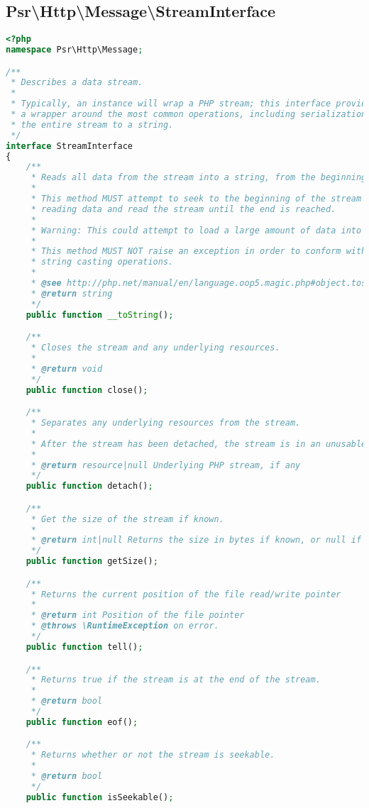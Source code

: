 \subsection{Psr\textbackslash Http\textbackslash Message\textbackslash StreamInterface}


\begin{lstlisting}[language=PHP]
<?php
namespace Psr\Http\Message;

/**
 * Describes a data stream.
 *
 * Typically, an instance will wrap a PHP stream; this interface provides
 * a wrapper around the most common operations, including serialization of
 * the entire stream to a string.
 */
interface StreamInterface
{
    /**
     * Reads all data from the stream into a string, from the beginning to end.
     *
     * This method MUST attempt to seek to the beginning of the stream before
     * reading data and read the stream until the end is reached.
     *
     * Warning: This could attempt to load a large amount of data into memory.
     *
     * This method MUST NOT raise an exception in order to conform with PHP's
     * string casting operations.
     *
     * @see http://php.net/manual/en/language.oop5.magic.php#object.tostring
     * @return string
     */
    public function __toString();

    /**
     * Closes the stream and any underlying resources.
     *
     * @return void
     */
    public function close();

    /**
     * Separates any underlying resources from the stream.
     *
     * After the stream has been detached, the stream is in an unusable state.
     *
     * @return resource|null Underlying PHP stream, if any
     */
    public function detach();

    /**
     * Get the size of the stream if known.
     *
     * @return int|null Returns the size in bytes if known, or null if unknown.
     */
    public function getSize();

    /**
     * Returns the current position of the file read/write pointer
     *
     * @return int Position of the file pointer
     * @throws \RuntimeException on error.
     */
    public function tell();

    /**
     * Returns true if the stream is at the end of the stream.
     *
     * @return bool
     */
    public function eof();

    /**
     * Returns whether or not the stream is seekable.
     *
     * @return bool
     */
    public function isSeekable();


\end{lstlisting}
